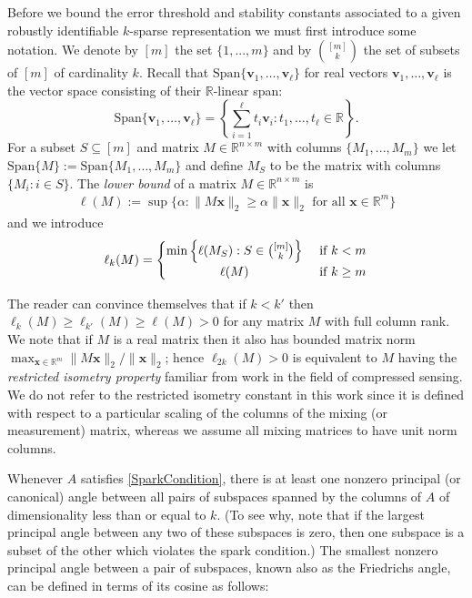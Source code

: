 \documentclass[journal, onecolumn]{IEEEtran}
\begin{document}
Before we bound the error threshold and stability constants associated to a given robustly identifiable $k$-sparse representation we must first introduce some notation. We denote by $[m]$ the set $\{1, ..., m\}$ and by ${[m] \choose k}$ the set of subsets of $[m]$ of cardinality $k$. Recall that $\text{Span}\{\mathbf{v}_1, \ldots, \mathbf{v}_\ell\}$ for real vectors $\mathbf{v}_1, \ldots, \mathbf{v}_\ell$ is the vector space consisting of their $\mathbb{R}$-linear span:
%
\[ \text{Span}\{\mathbf{v}_1, \ldots, \mathbf{v}_\ell\} = \left\{ \sum_{i=1}^\ell t_i\mathbf{v}_i : t_1, \ldots, t_\ell \in \mathbb{R}\right\}. \]
%
For a subset $S \subseteq [m]$ and matrix $M \in \mathbb{R}^{n \times m}$ with columns $\{M_1,...,M_m\}$ we let $\text{Span}\{M\} := \text{Span}\{M_1, \ldots, M_m\}$ and define $M_S$ to be the matrix with columns $\{M_i: i \in S\}$. The \emph{lower bound} of a matrix $M \in \mathbb{R}^{n \times m}$ \cite{refs?} is 
\begin{align*}
\ell(M) := \sup \{ \alpha : \|M\mathbf{x}\|_2 \geq \alpha\|\mathbf{x}\|_2 \text{ for all } \mathbf{x} \in \mathbb{R}^m\}
\end{align*}
%
and we introduce 
\[
 \ell_k(M) =
  \begin{cases} 
      \hfill \min \left\{ \ell(M_S) : S \in {[m] \choose k} \right\} \hfill & \text{ if $k < m$} \\
      \hfill \ell(M) \hfill & \text{ if $k \geq m$} \\
  \end{cases}
\]

The reader can convince themselves that if $k < k'$ then $\ell_{k}(M) \geq \ell_{k'}(M) \geq \ell(M) > 0$ for any matrix $M$ with full column rank. We note that if $M$ is a real matrix then it also has bounded matrix norm $\max_{\mathbf{x} \in \mathbb{R}^m}\|M\mathbf{x}\|_2 / \|\mathbf{x}\|_2$; hence $\ell_{2k}(M) > 0$ is equivalent to $M$ having the \emph{restricted isometry property} \cite{CandesTao05} familiar from work in the field of compressed sensing. We do not refer to the restricted isometry constant in this work since it is defined with respect to a particular scaling of the columns of the mixing (or measurement) matrix, whereas we assume all mixing matrices to have unit norm columns.

Whenever $A$ satisfies \eqref{SparkCondition}, there is at least one nonzero principal (or canonical) angle between all pairs of subspaces spanned by the columns of $A$ of dimensionality less than or equal to $k$. (To see why, note that if the largest principal angle between any two of these subspaces is zero, then one subspace is a subset of the other which violates the spark condition.) The smallest nonzero principal angle between a pair of subspaces, known also as the Friedrichs angle, can be defined in terms of its cosine as follows:
\end{document}
